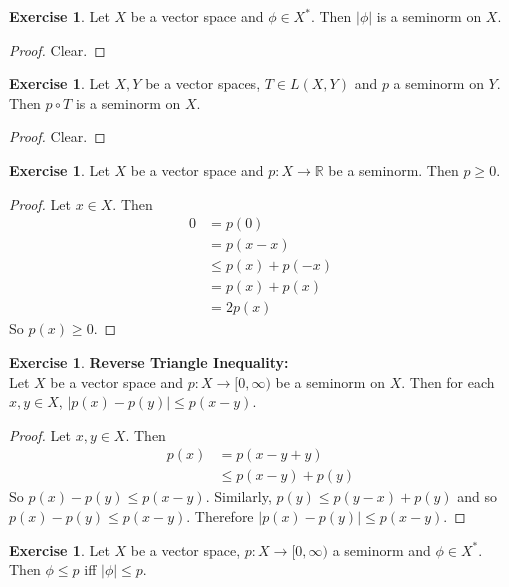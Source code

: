 \documentclass[12pt]{amsart}
\theoremstyle{definition}
\newtheorem{ex}[definition]{Exercise}
\newcommand{\R}{\mathbb{R}}
\newcommand{\tbf}[1]{\textbf{#1}}
\newcommand{\Rg}{[0,\infty)}
\DeclareMathOperator*{\0}{\mbf{0}}
\DeclareMathOperator*{\1}{\mbf{1}}
\newcommand{\lex}[1]{\label{ex:#1}}
\begin{document}
	\begin{ex}
		Let $X$ be a vector space and $\phi \in X^*$. Then $|\phi|$ is a seminorm on $X$.
	\end{ex}
	
	\begin{proof}
		Clear.
	\end{proof}

	\begin{ex}
		Let $X,Y$ be a vector spaces, $T \in L(X, Y)$ and $p$ a seminorm on $Y$. Then $p \circ T$ is a seminorm on $X$.
	\end{ex}
	
	\begin{proof}
		Clear.
	\end{proof}
	
	\begin{ex} \lex{55007}
		Let $X$ be a vector space and $p: X \rightarrow \R$ be a seminorm. Then $p \geq 0$. 
	\end{ex}
	
	\begin{proof}
		Let $x \in X$. Then 
		\begin{align*}
			0 
			&= p(0) \\ 
			&= p(x - x) \\
			&\leq  p(x) + p(-x) \\
			&= p(x) + p(x) \\
			&= 2p(x)
		\end{align*}
		So $p(x) \geq 0$.
	\end{proof}

	\begin{ex} \tbf{Reverse Triangle Inequality:} \\
		Let $X$ be a vector space and $p:X \rightarrow \Rg$ be a seminorm on $X$. Then for each $x ,y \in X$, $|p(x) - p(y)| \leq p(x - y)$.  
	\end{ex}
	
	\begin{proof}
		Let $x, y \in X$. Then 
		\begin{align*}
			p(x)
			&= p(x -y + y) \\
			&\leq p(x - y) + p(y) 
		\end{align*}
		So $p(x) - p(y) \leq p(x - y)$. 
		Similarly, $p(y) \leq p(y - x) + p(y)$ and so $p(x) - p(y) \leq p(x - y)$. Therefore $|p(x) - p(y)| \leq p(x - y)$.
	\end{proof}
	
	\begin{ex}
		Let $X$ be a vector space, $p: X \rightarrow \Rg$ a seminorm and $\phi \in X^*$. Then $\phi \leq p$ iff $|\phi| \leq p$. 
	\end{ex}
	
\end{document}
